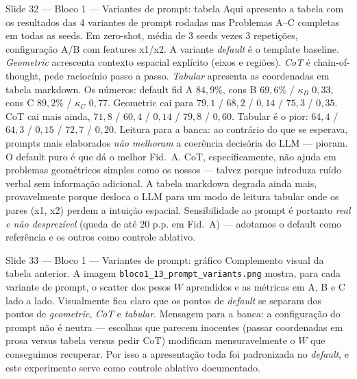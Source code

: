 \documentclass[aspectratio=169,10pt]{beamer}
\begin{document}
\begin{frame}{Slide 32 --- Bloco 1 --- Variantes de prompt: tabela}
\footnotesize
Aqui apresento a tabela com os resultados das 4 variantes de prompt rodadas nas Problemas A--C completas em todas as seeds. Em zero-shot, m\'edia de 3 seeds vezes 3 repeti\c{c}\~oes, configura\c{c}\~ao A/B com features x1/x2. A variante \emph{default} \'e o template baseline. \emph{Geometric} acrescenta contexto espacial expl\'icito (eixos e regi\~oes). \emph{CoT} \'e chain-of-thought, pede racioc\'inio passo a passo. \emph{Tabular} apresenta as coordenadas em tabela markdown. Os n\'umeros: default fid A $84{,}9\%$, cons B $69{,}6\%$ / $\kappa_B$ $0{,}33$, cons C $89{,}2\%$ / $\kappa_C$ $0{,}77$. Geometric cai para $79{,}1$ / $68{,}2$ / $0{,}14$ / $75{,}3$ / $0{,}35$. CoT cai mais ainda, $71{,}8$ / $60{,}4$ / $0{,}14$ / $79{,}8$ / $0{,}60$. Tabular \'e o pior: $64{,}4$ / $64{,}3$ / $0{,}15$ / $72{,}7$ / $0{,}20$. Leitura para a banca: ao contr\'ario do que se esperava, prompts mais elaborados \emph{n\~ao melhoram} a coer\^encia decis\'oria do LLM --- pioram. O default puro \'e que d\'a o melhor Fid.\ A. CoT, especificamente, n\~ao ajuda em problemas geom\'etricos simples como os nossos --- talvez porque introduza ru\'ido verbal sem informa\c{c}\~ao adicional. A tabela markdown degrada ainda mais, provavelmente porque desloca o LLM para um modo de leitura tabular onde os pares (x1, x2) perdem a intui\c{c}\~ao espacial. Sensibilidade ao prompt \'e portanto \emph{real e n\~ao desprez\'ivel} (queda de at\'e $20$ p.p. em Fid.\ A) --- adotamos o default como refer\^encia e os outros como controle ablativo.
\end{frame}

\begin{frame}{Slide 33 --- Bloco 1 --- Variantes de prompt: gr\'afico}
\footnotesize
Complemento visual da tabela anterior. A imagem \texttt{bloco1\_13\_prompt\_variants.png} mostra, para cada variante de prompt, o scatter dos pesos $W$ aprendidos e as m\'etricas em A, B e C lado a lado. Visualmente fica claro que os pontos de \emph{default} se separam dos pontos de \emph{geometric}, \emph{CoT} e \emph{tabular}. Mensagem para a banca: a configura\c{c}\~ao do prompt n\~ao \'e neutra --- escolhas que parecem inocentes (passar coordenadas em prosa versus tabela versus pedir CoT) modificam mensuravelmente o $W$ que conseguimos recuperar. Por isso a apresenta\c{c}\~ao toda foi padronizada no \emph{default}, e este experimento serve como controle ablativo documentado.
\end{frame}
\end{document}
